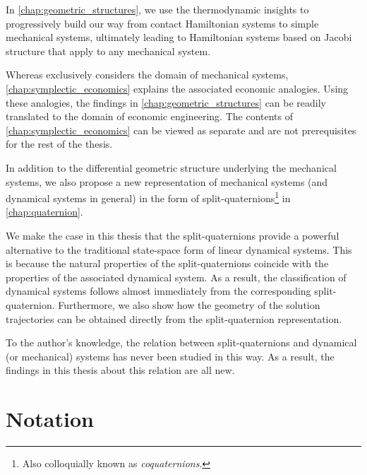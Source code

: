 In \cref{chap:geometric_structures}, we use the thermodynamic insights to progressively build our way from contact Hamiltonian systems to simple mechanical systems, ultimately leading to Hamiltonian systems based on Jacobi structure that apply to any mechanical system.
%

Whereas  exclusively considers the domain of mechanical systems, \cref{chap:symplectic_economics} explains the associated economic analogies. Using these analogies, the findings in \cref{chap:geometric_structures} can be readily translated to the domain of economic engineering. 
The contents of \cref{chap:symplectic_economics} can be viewed as separate and are not prerequisites for the rest of the thesis.

In addition to the differential geometric structure underlying the mechanical systems, we also propose a new representation of mechanical systems (and dynamical systems in general) in the form of split-quaternions\footnote{Also colloquially known as \emph{coquaternions}.} in \cref{chap:quaternion}. 

We make the case in this thesis that the split-quaternions provide a powerful alternative to the traditional state-space form of linear dynamical systems. This is because the natural properties of the split-quaternions coincide with the properties of the associated dynamical system. As a result, the classification of dynamical systems follows almost immediately from the corresponding split-quaternion. Furthermore, we also show how the geometry of the solution trajectories can be obtained directly from the split-quaternion representation.

To the author's knowledge, the relation between split-quaternions and dynamical (or mechanical) systems has never been studied in this way. As a result, the findings in this thesis about this relation are all new.

\section*{Notation}
